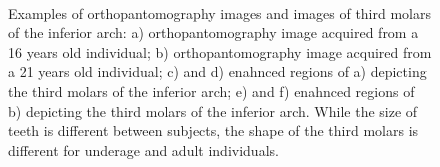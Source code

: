 \documentclass[conference]{IEEEtran}
\begin{document}
\begin{figure}[!t]
	\centering
	\\
	\caption{Examples of orthopantomography images and images of third molars of the inferior arch: a) orthopantomography image acquired from a 16 years old individual; b) orthopantomography image acquired from a 21 years old individual; c) and d) enahnced regions of a) depicting the third molars of the inferior arch; e) and f) enahnced regions of b) depicting the third molars of the inferior arch. While the size of teeth is different between subjects, the shape of the third molars is different for underage and adult individuals.}
	\label{figDenti}
\end{figure}
\end{document}
